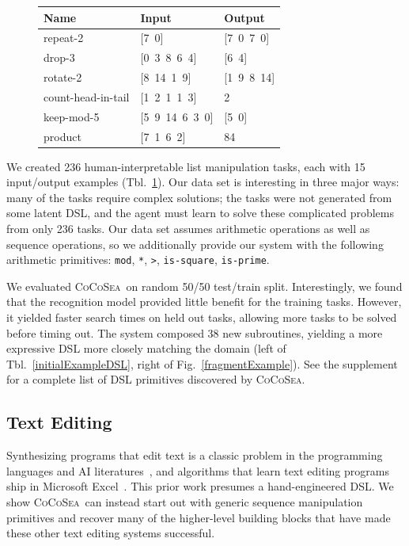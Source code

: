\documentclass{article}
\newcommand{\system}{\textsc{CoCoSea}~}
\newcommand{\systemEnding}{\textsc{CoCoSea}}
\newcommand{\code}[1]{{\footnotesize\texttt{#1}}}
\begin{document}
\begin{figure}\centering
  \begin{tabular}{lll}
    \toprule
    Name & Input & Output \\\midrule
    repeat-2 & [7\, 0] & [7\, 0\, 7\, 0] \\
    drop-3 & [0\, 3\, 8\, 6\, 4] & [6\, 4] \\
    rotate-2 & [8\, 14\, 1\, 9] & [1\, 9\, 8\, 14] \\
    count-head-in-tail & [1\, 2\, 1\, 1\, 3] & 2 \\
    keep-mod-5 & [5\, 9\, 14\, 6\, 3\, 0] & [5\, 0] \\
    product & [7\, 1\, 6\, 2] & 84 \\
    \bottomrule
  \end{tabular}
  \label{listexamples}
\end{figure}
We created 236 human-interpretable list manipulation tasks, each with 15
input/output examples (Tbl.~\ref{listexamples}).
Our data set is interesting in three major ways: many of the tasks require
complex solutions; the tasks were not generated from some latent DSL, and
the agent must learn to solve these complicated problems from only 236
tasks.
Our data set assumes arithmetic operations as well as sequence operations,
so we additionally provide our system with the following arithmetic
primitives: \code{mod}, \code{*}, \code{>}, \code{is-square},
\code{is-prime}.

We evaluated \system on  random 50/50 test/train split.
Interestingly, we found that the recognition model provided little benefit for the training
tasks. However, it yielded faster search times on held out tasks, allowing
more tasks to be solved before timing out.
The system composed 38 new subroutines, yielding a more expressive DSL more closely matching the
domain (left of Tbl.~\ref{initialExampleDSL}, right of
Fig.~\ref{fragmentExample}). See the supplement for a complete list of
DSL primitives discovered by \systemEnding.

\subsection{Text Editing}\label{textSection}
Synthesizing programs that edit text is a classic problem in the
programming languages and AI literatures~\cite{menon2013machine,lau2001programming},
and algorithms that learn text editing programs ship in Microsoft Excel~\cite{gulwani2011automating}.
This prior work presumes a hand-engineered DSL.
We show \system can instead start out with generic sequence manipulation
primitives and recover many of the higher-level building blocks that have
made these other text editing systems successful.
\end{document}
